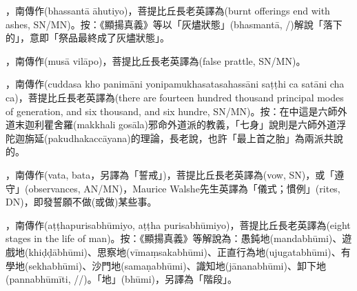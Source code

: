 \startitemgroup[noteitems]
\item{}，南傳作(bhassantā āhutiyo)，菩提比丘長老英譯為(burnt offerings end with ashes, SN/MN)。按：《顯揚真義》等以「灰燼狀態」(bhasmantā, /)解說「落下的」，意即「祭品最終成了灰燼狀態」。
\stopitemgroup

\startitemgroup[noteitems]
\item{}，南傳作(musā vilāpo)，菩提比丘長老英譯為(false prattle, SN/MN)。
\stopitemgroup

\startitemgroup[noteitems]
\item{}，南傳作(cuddasa kho panimāni yonipamukhasatasahassāni saṭṭhi ca satāni cha ca)，菩提比丘長老英譯為(there are fourteen hundred thousand principal modes of generation, and six thousand, and six hundre, SN/MN)。按：在中這是六師外道末迦利瞿舍羅(makkhali gosāla)邪命外道派的教義，「七身」說則是六師外道浮陀迦旃延(pakudhakaccāyana)的理論，長老說，也許「最上首之胎」為兩派共說的。
\stopitemgroup

\startitemgroup[noteitems]
\item{}，南傳作(vata, bata，另譯為「誓戒」)，菩提比丘長老英譯為(vow, SN)，或「遵守」(observances, AN/MN)，Maurice Walshe先生英譯為「儀式；慣例」(rites, DN)，即發誓願不做(或做)某些事。
\stopitemgroup

\startitemgroup[noteitems]
\item{}，南傳作(aṭṭhapurisabhūmiyo, aṭṭha purisabhūmiyo)，菩提比丘長老英譯為(eight stages in the life of man)。按：《顯揚真義》等解說為：愚鈍地(mandabhūmi)、遊戲地(khiḍḍābhūmi)、思察地(vīmaṃsakabhūmi)、正直行為地(ujugatabhūmi)、有學地(sekhabhūmi)、沙門地(samaṇabhūmi)、識知地(jānanabhūmi)、卸下地(pannabhūmīti, //)。「地」(bhūmi)，另譯為「階段」。
\stopitemgroup

